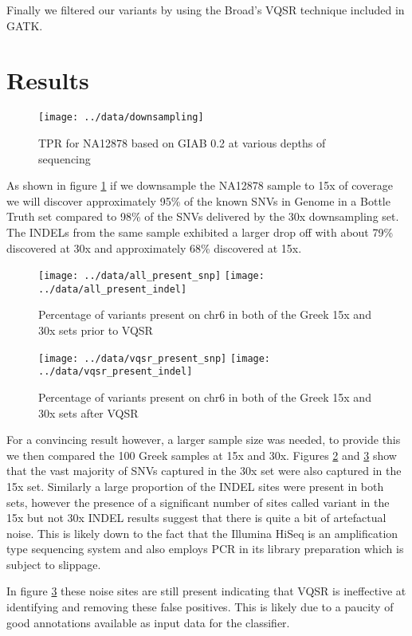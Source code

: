 \documentclass{article}
\begin{document}
  {Finally we filtered our variants by using the Broad's VQSR technique included in GATK.}

  \section{Results}
  \begin{figure}
  \texttt{[image: ../data/downsampling]}
  \caption{TPR for NA12878 based on GIAB 0.2 at various depths of sequencing}
  \label{fig:na12878_ds}
  \end{figure}
  {As shown in figure \ref{fig:na12878_ds} if we downsample the NA12878 sample to 15x of coverage we will discover approximately 95\% of the known SNVs in Genome in a Bottle Truth set\cite{giab} compared to 98\% of the SNVs delivered by the 30x downsampling set. The INDELs from the same sample exhibited a larger drop off with about 79\% discovered at 30x and approximately 68\% discovered at 15x.}

  \begin{figure}
  \texttt{[image: ../data/all\_present\_snp]}
  \texttt{[image: ../data/all\_present\_indel]}
  \caption{Percentage of variants present on chr6 in both of the Greek 15x and 30x sets prior to VQSR}
  \label{fig:all_present}
  \end{figure}
  \begin{figure}
  \texttt{[image: ../data/vqsr\_present\_snp]}
  \texttt{[image: ../data/vqsr\_present\_indel]}
  \caption{Percentage of variants present on chr6 in both of the Greek 15x and 30x sets after VQSR}
  \label{fig:vqsr_present}
  \end{figure}

  {For a convincing result however, a larger sample size was needed, to provide this we then compared the 100 Greek samples at 15x and 30x. Figures \ref{fig:all_present} and \ref{fig:vqsr_present} show that the vast majority of SNVs captured in the 30x set were also captured in the 15x set. Similarly a large proportion of the INDEL sites were present in both sets, however the presence of a significant number of sites called variant in the 15x but not 30x INDEL results suggest that there is quite a bit of artefactual noise. This is likely down to the fact that the Illumina HiSeq is an amplification type sequencing system and also employs PCR in its library preparation which is subject to slippage.}

  {In figure \ref{fig:vqsr_present} these noise sites are still present indicating that VQSR is ineffective at identifying and removing these false positives. This is likely due to a paucity of good annotations available as input data for the classifier.}
\end{document}
